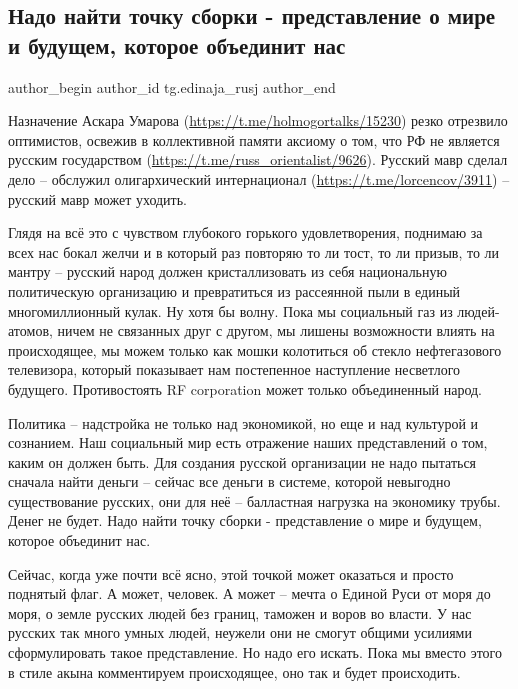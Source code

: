  
 
 
 
 
\subsection{Надо найти точку сборки - представление о мире и будущем, которое объединит нас}
\label{sec:11_01_2022.tg.edinaja_rusj.1.rus_narod_sborka}

\ifcmt
 author_begin
   author_id tg.edinaja_rusj
 author_end
\fi

Назначение Аскара Умарова (\url{https://t.me/holmogortalks/15230}) резко
отрезвило оптимистов, освежив в коллективной памяти аксиому о том, что РФ не
является русским государством (\url{https://t.me/russ_orientalist/9626}).
Русский мавр сделал дело – обслужил олигархический интернационал
(\url{https://t.me/lorcencov/3911}) – русский мавр может уходить. 

Глядя на всё это с чувством глубокого горького удовлетворения, поднимаю за всех
нас бокал желчи и в который раз повторяю то ли тост, то ли призыв, то ли мантру
– русский народ должен кристаллизовать из себя национальную политическую
организацию и превратиться из рассеянной пыли в единый многомиллионный кулак.
Ну хотя бы волну. Пока мы социальный газ из людей-атомов, ничем не связанных
друг с другом, мы лишены возможности влиять на происходящее, мы можем только
как мошки колотиться об стекло нефтегазового телевизора, который показывает нам
постепенное наступление несветлого будущего. Противостоять RF corporation может
только объединенный народ.

Политика – надстройка не только над экономикой, но еще и над культурой и
сознанием. Наш социальный мир есть отражение наших представлений о том, каким
он должен быть. Для создания русской организации не надо пытаться сначала найти
деньги – сейчас все деньги в системе, которой невыгодно существование русских,
они для неё – балластная нагрузка на экономику трубы. Денег не будет. Надо
найти точку сборки - представление о мире и будущем, которое объединит нас.

Сейчас, когда уже почти всё ясно, этой точкой может оказаться и просто поднятый
флаг. А может, человек. А может – мечта о Единой Руси от моря до моря, о земле
русских людей без границ, таможен и воров во власти. У нас русских так много
умных людей, неужели они не смогут общими усилиями сформулировать такое
представление. Но надо его искать. Пока мы вместо этого в стиле акына
комментируем происходящее, оно так и будет происходить.

